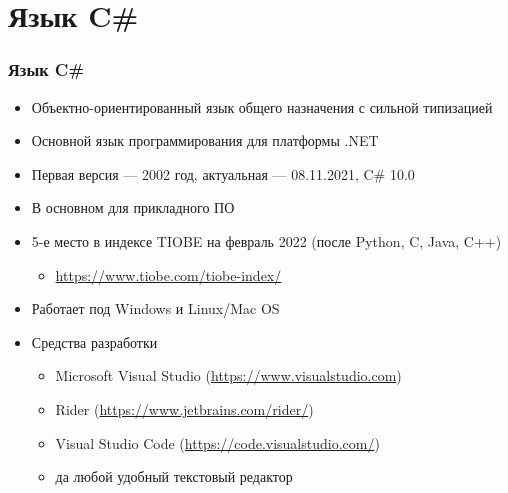 \documentclass{../../slides-style}
\begin{document}
    \section{Язык C\#}

    \begin{frame}
        \frametitle{Язык C\#}
        \begin{itemize}
            \item Объектно-ориентированный язык общего назначения с сильной типизацией
            \item Основной язык программирования для платформы .NET
            \item Первая версия --- 2002 год, актуальная --- 08.11.2021, C\# 10.0
            \item В основном для прикладного ПО
            \item 5-е место в индексе TIOBE на февраль 2022 (после Python, C, Java, C++)
            \begin{itemize}
                \item \url{https://www.tiobe.com/tiobe-index/}
            \end{itemize}
            \item Работает под Windows и Linux/Mac OS
            \item Средства разработки
            \begin{itemize}
                \item Microsoft Visual Studio (\url{https://www.visualstudio.com})
                \item Rider (\url{https://www.jetbrains.com/rider/})
                \item Visual Studio Code (\url{https://code.visualstudio.com/})
                \item да любой удобный текстовый редактор
            \end{itemize}
        \end{itemize}
    \end{frame}
\end{document}
